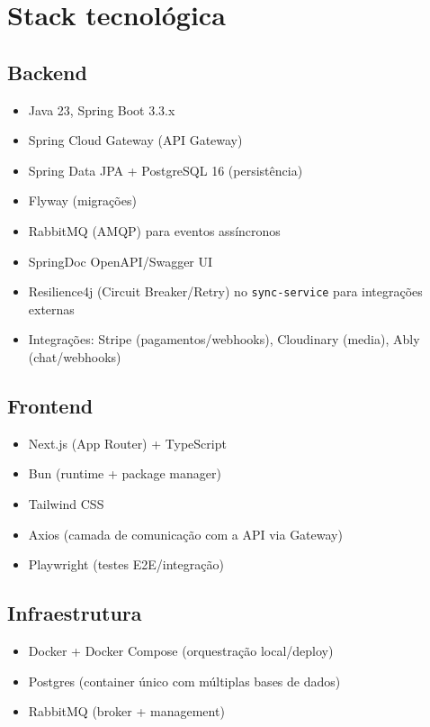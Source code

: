\section{Stack tecnológica}
\subsection{Backend}
\begin{itemize}[nosep]
  \item Java 23, Spring Boot 3.3.x
  \item Spring Cloud Gateway (API Gateway)
  \item Spring Data JPA + PostgreSQL 16 (persistência)
  \item Flyway (migrações)
  \item RabbitMQ (AMQP) para eventos assíncronos
  \item SpringDoc OpenAPI/Swagger UI
  \item Resilience4j (Circuit Breaker/Retry) no \texttt{sync-service} para integrações externas
  \item Integrações: Stripe (pagamentos/webhooks), Cloudinary (media), Ably (chat/webhooks)
\end{itemize}

\subsection{Frontend}
\begin{itemize}[nosep]
  \item Next.js (App Router) + TypeScript
  \item Bun (runtime + package manager)
  \item Tailwind CSS
  \item Axios (camada de comunicação com a API via Gateway)
  \item Playwright (testes E2E/integração)
\end{itemize}

\subsection{Infraestrutura}
\begin{itemize}[nosep]
  \item Docker + Docker Compose (orquestração local/deploy)
  \item Postgres (container único com múltiplas bases de dados)
  \item RabbitMQ (broker + management)
\end{itemize}

